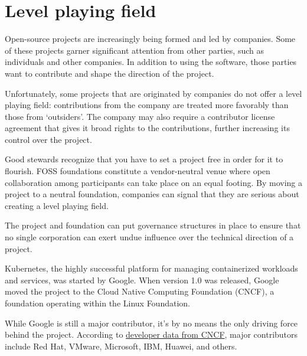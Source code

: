 


\chapter{Level playing field}

Open-source projects are increasingly being formed and led by companies.  Some of these projects garner significant attention from other parties, such as individuals and other companies.  In addition to using the software, those parties want to contribute and shape the direction of the project.

Unfortunately, some projects that are originated by companies do not offer a level playing field: contributions from the company are treated more favorably than those from `outsiders'.  The company may also require a contributor license agreement that gives it broad rights to the contributions, further increasing its control over the project.

Good stewards recognize that you have to set a project free in order for it to flourish.  FOSS foundations constitute a vendor-neutral venue where open collaboration among participants can take place on an equal footing.  By moving a project to a neutral foundation, companies can signal that they are serious about creating a level playing field.

The project and foundation can put governance structures in place to ensure that no single corporation can exert undue influence over the technical direction of a project.

\begin{kaobox}[frametitle=Kubernetes and the Cloud Native Computing Foundation]

Kubernetes, the highly successful platform for managing containerized workloads and services, was started by Google.  When version 1.0 was released, Google moved the project to the Cloud Native Computing Foundation (CNCF), a foundation operating within the Linux Foundation.

While Google is still a major contributor, it's by no means the only driving force behind the project.  According to \href{https://k8s.devstats.cncf.io/d/9/companies-table}{developer data from CNCF}, major contributors include Red Hat, VMware, Microsoft, IBM, Huawei, and others.

\end{kaobox}


